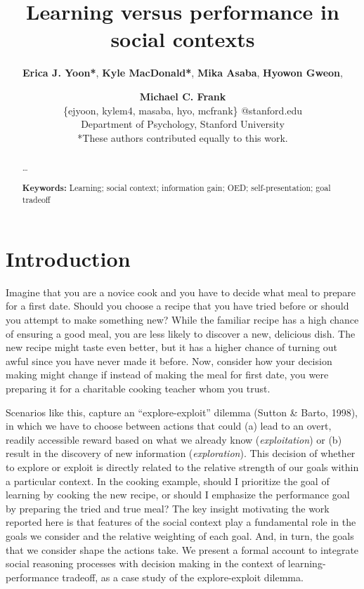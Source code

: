\documentclass[10pt, letterpaper]{article}
\title{Learning versus performance in social contexts}
\author{{\large \bf Erica J. Yoon*}, {\large \bf Kyle MacDonald*}, {\large \bf Mika Asaba}, {\large \bf Hyowon Gweon}, \and {\large \bf Michael C. Frank} \\ \{ejyoon, kylem4, masaba, hyo, mcfrank\} @stanford.edu \\ Department of Psychology, Stanford University \\ *These authors contributed equally to this work.}
\begin{document}
\maketitle

\begin{abstract}
\ldots{}

\textbf{Keywords:}
Learning; social context; information gain; OED; self-presentation; goal
tradeoff
\end{abstract}

\section{Introduction}\label{introduction}

Imagine that you are a novice cook and you have to decide what meal to
prepare for a first date. Should you choose a recipe that you have tried
before or should you attempt to make something new? While the familiar
recipe has a high chance of ensuring a good meal, you are less likely to
discover a new, delicious dish. The new recipe might taste even better,
but it has a higher chance of turning out awful since you have never
made it before. Now, consider how your decision making might change if
instead of making the meal for first date, you were preparing it for a
charitable cooking teacher whom you trust.

Scenarios like this, capture an ``explore-exploit'' dilemma (Sutton \&
Barto, 1998), in which we have to choose between actions that could (a)
lead to an overt, readily accessible reward based on what we already
know (\emph{exploitation}) or (b) result in the discovery of new
information (\emph{exploration}). This decision of whether to explore or
exploit is directly related to the relative strength of our goals within
a particular context. In the cooking example, should I prioritize the
goal of learning by cooking the new recipe, or should I emphasize the
performance goal by preparing the tried and true meal? The key insight
motivating the work reported here is that features of the social context
play a fundamental role in the goals we consider and the relative
weighting of each goal. And, in turn, the goals that we consider shape
the actions take. We present a formal account to integrate social
reasoning processes with decision making in the context of
learning-performance tradeoff, as a case study of the explore-exploit
dilemma.
\end{document}
